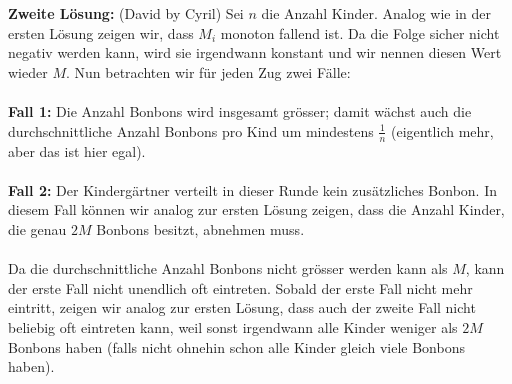 {\\ \\
\textbf{Zweite Lösung:} (David by Cyril)
 Sei $n$ die Anzahl Kinder. Analog wie in der ersten Lösung zeigen wir, dass $M_i$ monoton fallend ist. Da die Folge sicher nicht negativ werden kann, wird sie irgendwann konstant und wir nennen diesen Wert wieder $M$. Nun betrachten wir für jeden Zug zwei Fälle:
 \\ \\
 \textbf{Fall 1:} Die Anzahl Bonbons wird insgesamt grösser; damit wächst auch die durchschnittliche Anzahl Bonbons pro Kind um mindestens $\frac{1}{n}$ (eigentlich mehr, aber das ist hier egal).
 \\ \\
 \textbf{Fall 2:} Der Kindergärtner verteilt in dieser Runde kein zusätzliches Bonbon. In diesem Fall können wir analog zur ersten Lösung zeigen, dass die Anzahl Kinder, die genau $2M$ Bonbons besitzt, abnehmen muss.
 \\ \\
 Da die durchschnittliche Anzahl Bonbons nicht grösser werden kann als $M$, kann der erste Fall nicht unendlich oft eintreten. Sobald der erste Fall nicht mehr eintritt, zeigen wir analog zur ersten Lösung, dass auch der zweite Fall nicht beliebig oft eintreten kann, weil sonst irgendwann alle Kinder weniger als $2M$ Bonbons haben (falls nicht ohnehin schon alle Kinder gleich viele Bonbons haben).
 \\ \\

}
